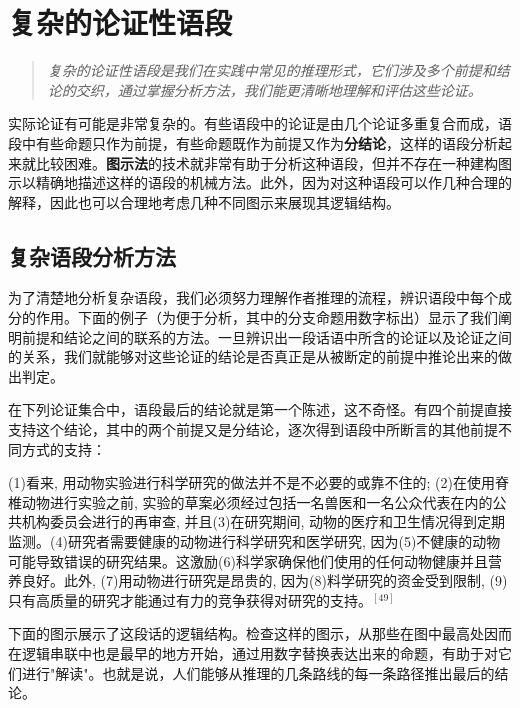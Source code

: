 \section{复杂的论证性语段}

\begin{quotation}
\textit{复杂的论证性语段是我们在实践中常见的推理形式，它们涉及多个前提和结论的交织，通过掌握分析方法，我们能更清晰地理解和评估这些论证。}
\end{quotation}

实际论证有可能是非常复杂的。有些语段中的论证是由几个论证多重复合而成，语段中有些命题只作为前提，有些命题既作为前提又作为\textbf{分结论}，这样的语段分析起来就比较困难。\textbf{图示法}的技术就非常有助于分析这种语段，但并不存在一种建构图示以精确地描述这样的语段的机械方法。此外，因为对这种语段可以作几种合理的解释，因此也可以合理地考虑几种不同图示来展现其逻辑结构。

\subsection{复杂语段分析方法}

为了清楚地分析复杂语段，我们必须努力理解作者推理的流程，辨识语段中每个成分的作用。下面的例子（为便于分析，其中的分支命题用数字标出）显示了我们阐明前提和结论之间的联系的方法。一旦辨识出一段话语中所含的论证以及论证之间的关系，我们就能够对这些论证的结论是否真正是从被断定的前提中推论出来的做出判定。

在下列论证集合中，语段最后的结论就是第一个陈述，这不奇怪。有四个前提直接支持这个结论，其中的两个前提又是分结论，逐次得到语段中所断言的其他前提不同方式的支持：

\begin{displayquote}
(1)看来, 用动物实验进行科学研究的做法并不是不必要的或靠不住的; (2)在使用脊椎动物进行实验之前, 实验的草案必须经过包括一名兽医和一名公众代表在内的公共机构委员会进行的再审查, 并且(3)在研究期间, 动物的医疗和卫生情况得到定期监测。(4)研究者需要健康的动物进行科学研究和医学研究, 因为(5)不健康的动物可能导致错误的研究结果。这激励(6)科学家确保他们使用的任何动物健康并且营养良好。此外, (7)用动物进行研究是昂贵的, 因为(8)料学研究的资金受到限制, (9)只有高质量的研究才能通过有力的竞争获得对研究的支持。$^{[49]}$
\end{displayquote}

下面的图示展示了这段话的逻辑结构。检查这样的图示，从那些在图中最高处因而在逻辑串联中也是最早的地方开始，通过用数字替换表达出来的命题，有助于对它们进行"解读"。也就是说，人们能够从推理的几条路线的每一条路径推出最后的结论。

